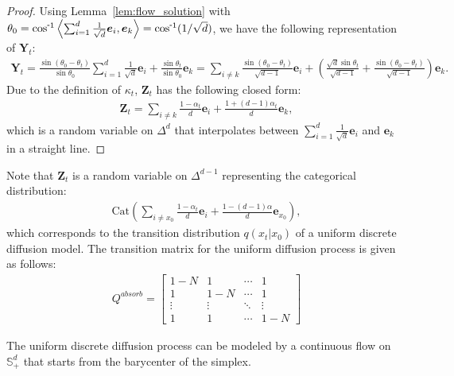 \begin{proof}
Using Lemma~\ref{lem:flow_solution} with $\theta_0 = \invcos \left\langle \sum^{d}_{i=1} \frac{1}{\sqrt{d}}\bm{e}_i,\bm{e}_k \right\rangle = \invcos (1/\sqrt{d})$, we have the following representation of $\bm{Y}_t$:
\begin{align}
    \bm{Y}_t = \frac{\sin(\theta_0 - \theta_t)}{\sin\theta_0} \sum^{d}_{i=1} \frac{1}{\sqrt{d}}\bm{e}_i + \frac{\sin\theta_t}{\sin\theta_0} \bm{e}_k 
    = \sum_{i\neq k} \frac{\sin(\theta_0 - \theta_t)}{\sqrt{d-1}} \bm{e}_i + \left(
        \frac{\sqrt{d}\sin\theta_t}{\sqrt{d-1}} +  \frac{\sin(\theta_0 - \theta_t)}{\sqrt{d-1}} 
    \right) \bm{e}_k.
\end{align}
Due to the definition of $\kappa_t$, $\bm{Z}_t$ has the following closed form:
\begin{align}
    \bm{Z}_t = \sum_{i\neq k}\frac{1-\alpha_t}{d}\bm{e}_i + \frac{1 + (d-1)\alpha_t}{d}\bm{e}_k ,
\end{align}
which is a random variable on $\Delta^d$ that interpolates between $\sum^{d}_{i=1} \frac{1}{\sqrt{d}}\bm{e}_i$ and $\bm{e}_k$ in a straight line.
\end{proof}

Note that $\bm{Z}_t$ is a random variable on $\Delta^{d-1}$ representing the categorical distribution:
\begin{align}
    \text{Cat}\left(\sum_{i\neq x_0}\frac{1-\alpha_t}{d}\bm{e}_i + \frac{1 - (d-1)\alpha}{d}\bm{e}_{x_0}\right),
\end{align}
which corresponds to the transition distribution $q(x_t|x_0)$ of a uniform discrete diffusion model.
The transition matrix for the uniform diffusion process is given as follows: 
\begin{align}
    Q^{absorb} = \begin{bmatrix}
        1-N & 1 & \cdots & 1 \\
        1 & 1-N & \cdots & 1 \\
        \vdots & \vdots & \ddots & \vdots \\ 
        1 & 1 & \cdots & 1-N
    \end{bmatrix}
\end{align}



\begin{tcolorbox}[colback=white,colframe=blue!30!white]
\begin{corollary}
The uniform discrete diffusion process can be modeled by a continuous flow on $\mathbb{S}^{d}_{+}$ that starts from the barycenter of the simplex.
\end{corollary}
\end{tcolorbox}



